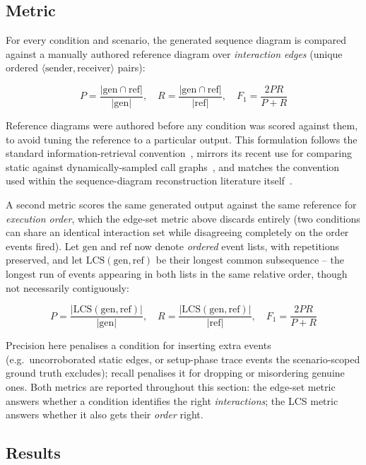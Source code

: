 \subsection{Metric}

For every condition and scenario, the generated \sysml sequence diagram
is compared against a manually authored reference diagram over
\emph{interaction edges} (unique ordered $\langle\text{sender},
\text{receiver}\rangle$ pairs):

\[
  P = \frac{|\text{gen} \cap \text{ref}|}{|\text{gen}|}, \quad
  R = \frac{|\text{gen} \cap \text{ref}|}{|\text{ref}|}, \quad
  F_1 = \frac{2PR}{P + R}
\]

Reference diagrams were authored before any condition was scored against
them, to avoid tuning the reference to a particular output.
This formulation follows the standard information-retrieval
convention~\cite{manning:ir}, mirrors its recent use for comparing
static against dynamically-sampled call graphs~\cite{helm:totalrecall},
and matches the convention used within the sequence-diagram
reconstruction literature itself~\cite{taniguchi:seqtrace}.

A second metric scores the same generated output against the same
reference for \emph{execution order}, which the edge-set metric above
discards entirely (two conditions can share an identical interaction
set while disagreeing completely on the order events fired). Let
$\text{gen}$ and $\text{ref}$ now denote \emph{ordered} event lists,
with repetitions preserved, and let $\mathrm{LCS}(\text{gen},
\text{ref})$ be their longest common subsequence -- the longest run of
events appearing in both lists in the same relative order, though not
necessarily contiguously:

\[
  P = \frac{|\mathrm{LCS}(\text{gen}, \text{ref})|}{|\text{gen}|}, \quad
  R = \frac{|\mathrm{LCS}(\text{gen}, \text{ref})|}{|\text{ref}|}, \quad
  F_1 = \frac{2PR}{P + R}
\]

Precision here penalises a condition for inserting extra events (e.g.\
uncorroborated static edges, or setup-phase trace events the
scenario-scoped ground truth excludes); recall penalises it for
dropping or misordering genuine ones. Both metrics are reported
throughout this section: the edge-set metric answers whether a
condition identifies the right \emph{interactions}; the LCS metric
answers whether it also gets their \emph{order} right.

\subsection{Results}\label{sec:h1-results}

